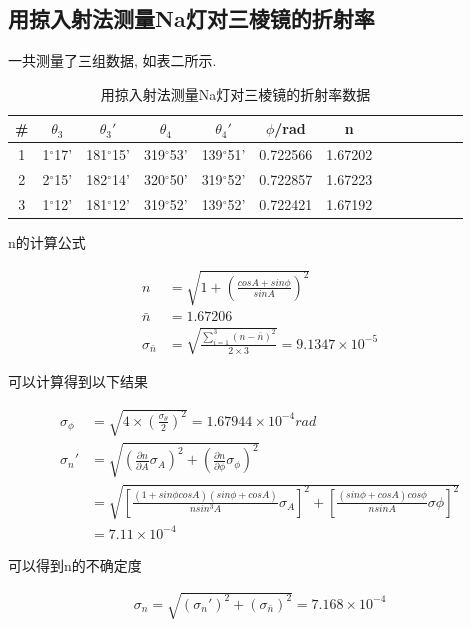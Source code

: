 \documentclass[a4paper,12pt,notitlepage]{article}
\begin{document}
\subsection{用掠入射法测量Na灯对三棱镜的折射率}

	一共测量了三组数据, 如表二所示.
	
\begin{center}
	\begin{longtable}{|c|c|c|c|c|c|c|c|c|c|c|c|c|}

	\caption{用掠入射法测量Na灯对三棱镜的折射率数据}	\\
	\hline
	\# & $\theta_3$ & $\theta_3'$ & $\theta_4$ & $\theta_4'$ & $\phi$/rad & n \\
	\hline
	1 & 1$^\circ$17' & 181$^\circ$15' & 319$^\circ$53' & 139$^\circ$51' & 0.722566 & 1.67202 \\
	\hline
	2 & 2$^\circ$15' & 182$^\circ$14' & 320$^\circ$50' & 319$^\circ$52' & 0.722857 & 1.67223 \\
	\hline
	3 & 1$^\circ$12' & 181$^\circ$12' & 319$^\circ$52' & 139$^\circ$52' & 0.722421 & 1.67192 \\
	\hline
	
	\end{longtable}
\end{center}

	n的计算公式

\begin{align*}
	n &= \sqrt{1 + (\frac{cosA + sin\phi}{sinA})^2} \\
	\bar{n} &= 1.67206 \\
	\sigma_{\bar{n}} &= \sqrt{\frac{\sum_{i = 1}^3(n - \bar{n})^2}{2 \times 3}} = 9.1347 \times 10^{-5}
\end{align*}

	可以计算得到以下结果
	
\begin{align*}
	\sigma_{\phi} &= \sqrt{4 \times (\frac{\sigma_{\theta}}{2})^2} = 1.67944 \times 10^{-4} rad \\
	\sigma_n' &= \sqrt{(\frac{\partial n}{\partial A}\sigma_A)^2 + (\frac{\partial n}{\partial \phi}\sigma_\phi)^2} \\
	&= \sqrt{[\frac{(1 + sin\phi cosA)(sin\phi+ cosA)}{n sin^3A}\sigma_A]^2 + [\frac{(sin\phi + cosA)cos\phi}{nsinA}\sigma\phi]^2} \\
	&= 7.11 \times 10^{-4}
\end{align*}

	可以得到n的不确定度
	
\begin{align*}
	\sigma_n = \sqrt{(\sigma_n')^2 + (\sigma_{\bar{n}})^2} = 7.168 \times 10^{-4}
\end{align*}
\end{document}
